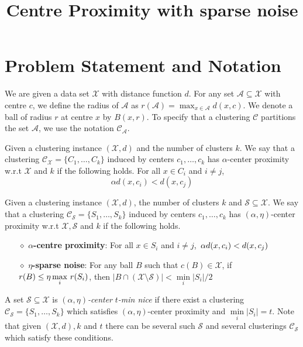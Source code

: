 \documentclass[11pt]{article}
\title{\LARGE Centre Proximity with sparse noise}
\author{}
\newcommand{\mc}{\mathcal}
\begin{document}
\maketitle

\section{Problem Statement and Notation}
We are given a data set $\mc X$ with distance function $d$. For any set $\mc A\subseteq \mc X$ with centre $c$, we define the radius of $\mc A$ as $r(\mc A) = \max_{x \in \mc A} d(x, c)$. We denote a ball of radius $r$ at centre $x$ by $B(x, r)$. To specify that a clustering $\mc C$ partitions the set $\mc A$, we use the notation $\mc C_{\mc A}$.

\begin{definition}
\label{defn:alphacp}
Given a clustering instance $(\mc X, d)$ and the number of clusters $k$. We say that a clustering $\mc C_{\mc X} = \{C_1, \ldots, C_k\}$ induced by centers $c_1, \ldots, c_k$ has $\alpha$-center proximity w.r.t $\mc X$ and $k$ if the following holds. For all $x \in C_i$ and $i\neq j$, 
$$\alpha d(x, c_i) < d(x, c_j)$$
\end{definition}

\begin{definition}
Given a clustering instance $(\mc X, d)$, the number of clusters $k$ and $\mc S \subseteq \mc X$. We say that a clustering $\mc C_{\mc S} = \{S_1, \ldots, S_k\}$ induced by centers $c_1, \ldots, c_k$ has $(\alpha, \eta)$-center proximity w.r.t $\mc X, \mc S$ and $k$ if the following holds.

\begin{itemize}[nolistsep, noitemsep]
\label{defn:alphacpnoise}	

\item[$\diamond$] {\bf $\alpha$-centre proximity}: For all $x \in S_i$ and $i\neq j$, $\thinspace\alpha d(x, c_i) < d(x, c_j)$
\item[$\diamond$]{\bf $\eta$-sparse noise}: For any ball $B$ such that $c(B)\in \mathcal{X}$, if $r(B)\leq \eta\max\limits_{i} \thinspace r(S_i)$, then $|B\cap (\mc X\setminus \mc S)| < \min\limits_{i} |S_i|/2$
\end{itemize}
\end{definition}

\noindent A set $\mc S \subseteq \mc X$ is {\it $(\alpha, \eta)$-center} {\it $t$-min nice} if there exist a clustering $\mc C_{\mc S}=\{S_1,\ldots,S_k\}$ which satisfies $(\alpha, \eta)$-center proximity and $\min\limits_{i} \lvert S_i\rvert = t$. Note that given $(\mc X, d), k$ and $t$ there can be several such $\mc S$ and several clusterings $\mc C_{\mc S}$ which satisfy these conditions.
\end{document}
